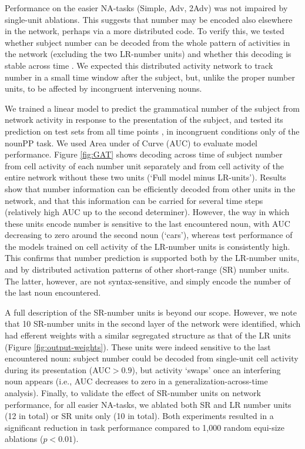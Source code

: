 Performance on the easier NA-tasks (Simple, Adv, 2Adv) was not
impaired by single-unit ablations. This suggests that number may be
encoded also elsewhere in the network, perhaps via a more distributed
code. To verify this, we tested whether subject number can be decoded from the whole
pattern of activities in the network (excluding the two LR-number units)
and whether this decoding is stable across time \cite[see][for similar
observations and related methods]{Giulianelli:etal:2018}. We expected
this distributed activity network to track number in a
small time window after the subject, but, unlike the proper number units,
to be affected by incongruent intervening nouns.

We trained a linear model to predict the grammatical number of the
subject from network activity in response to the presentation of the
subject, and tested its prediction on test sets from all time points
\cite{King:Dehaene:2014}, in incongruent conditions only of the nounPP
task. We used Area under of Curve (AUC) to evaluate model
performance. Figure \ref{fig:GAT} shows decoding across time of
subject number from cell activity of each number unit separately and
from cell activity of the entire network without these two units
(`Full model minus LR-units'). Results show that number information
can be efficiently decoded from other units in the network, and that
this information can be carried for several time steps (relatively
high AUC up to the second determiner). However, the way in which these
units encode number is sensitive to the last encountered noun, with
AUC decreasing to zero around the second noun (`cars'), whereas test
performance of the models trained on cell activity of the LR-number
units is consistently high. This confirms that number prediction is
supported both by the LR-number units, and by distributed activation
patterns of other short-range (SR) number units. The latter, however,
are not syntax-sensitive, and simply encode the number of the last
noun encountered.


A full description of the SR-number units is beyond our scope. However, we note that 10 SR-number units in the second layer of the
network were identified, which had efferent weights with a similar segregated
structure as that of the LR units (Figure
\ref{fig:output-weights}). These units were indeed sensitive to the last
encountered noun: subject number could be decoded from single-unit cell activity
during its presentation (AUC$>0.9$), but activity `swaps' once an
interfering noun appears (i.e., AUC decreases to zero in a
generalization-across-time analysis). Finally, to validate the effect of SR-number units on network performance, for all easier NA-tasks, we ablated both SR and LR number
units (12 in total) or SR units only (10 in total). Both experiments
resulted in a significant reduction in task performance compared to
1,000 random equi-size ablations ($p<0.01$).

